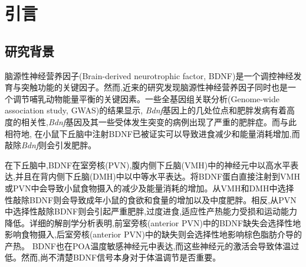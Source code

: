 \chapter{引言}\label{chap:introduction}

\section{研究背景}
脑源性神经营养因子(Brain-derived neurotrophic factor, BDNF)是一个调控神经发育与突触功能的关键因子。然而,近来的研究发现脑源性神经营养因子同时也是一个调节哺乳动物能量平衡的关键因素\citep{xu2016neurotrophic}。一些全基因组关联分析(Genome-wide association study, GWAS)的结果显示, \textit{Bdnf}基因上的几处位点和肥胖发病有着高度的相关性\citep{thorleifsson2009genome,speliotes2010association,wen2012meta},\textit{Bdnf}基因及其一些受体发生突变的病例出现了严重的肥胖症\citep{gray2006hyperphagia}。而与此相符地, 在小鼠下丘脑中注射BDNF已被证实可以导致进食减少和能量消耗增加\citep{wang2007abrain,wang2007bbrain,wang2010brain,godar2011reduction},而敲除\textit{Bdnf}则会引发肥胖\citep{xu2003brain, unger2007selective, liao2012dendritically}。

在下丘脑中,BDNF在室旁核(PVN),腹内侧下丘脑(VMH)中的神经元中以高水平表达,并且在背内侧下丘脑(DMH)中以中等水平表达\citep{xu2003brain, unger2007selective,liao2012dendritically,an2015discrete}。将BDNF蛋白直接注射到VMH或PVN中会导致小鼠食物摄入的减少及能量消耗的增加\citep{wang2007abrain,wang2007bbrain,godar2011reduction}。从VMH和DMH中选择性敲除BDNF则会导致成年小鼠的食欲和食量的增加以及中度肥胖\citep{unger2007selective}。相反,从PVN中选择性敲除BDNF则会引起严重肥胖,过度进食,适应性产热能力受损和运动能力降低\citep{an2015discrete}。详细的解剖学分析表明,前室旁核(anterior PVN)中的BDNF缺失会选择性地影响食物摄入,后室旁核(anterior PVN)中的缺失则会选择性地影响棕色脂肪介导的产热\citep{an2015discrete}。 BDNF也在POA温度敏感神经元中表达\citep{tan2016warm,zhao2017hypothalamic},而这些神经元的激活会导致体温过低\citep{tan2016warm}。然而,尚不清楚BDNF信号本身对于体温调节是否重要。

